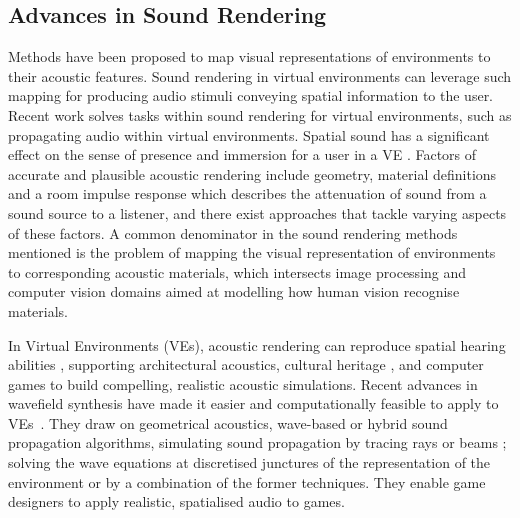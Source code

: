 \subsection{Advances in Sound Rendering}
Methods have been proposed to map visual representations of environments to their acoustic features. Sound rendering in virtual environments can leverage such mapping for producing audio stimuli conveying spatial information to the user. Recent work solves tasks within sound rendering for virtual environments, such as propagating audio within virtual environments. 
Spatial sound has a significant effect on the sense of presence and immersion for a user in a VE \cite{poeschl13}. Factors of accurate and plausible acoustic rendering include geometry, material definitions and a room impulse response which describes the attenuation of sound from a sound source to a listener, and there exist approaches that tackle varying aspects of these factors.
A common denominator in the sound rendering methods mentioned is the problem of mapping the visual representation of environments to corresponding acoustic materials, which intersects image processing and computer vision domains aimed at modelling how human vision recognise materials.\par%

In Virtual Environments (VEs), acoustic rendering can reproduce spatial hearing abilities \cite{lokki2005navigation}, supporting architectural acoustics, cultural heritage \cite{berardi2016acoustic, vorlander2015virtual}, and computer games \cite{raghuvanshi2014parametric, mehra2015wave} to build compelling, realistic acoustic simulations. Recent advances in wavefield synthesis have made it easier and computationally feasible to apply to VEs~\cite{raghuvanshi2014parametric}. They draw on geometrical acoustics, wave-based or hybrid sound propagation algorithms, simulating sound propagation by tracing rays or beams \cite{hulusic2012acoustic}; solving the wave equations at discretised junctures of the representation of the environment or by a combination of the former techniques. They enable game designers to apply realistic, spatialised audio to games.

